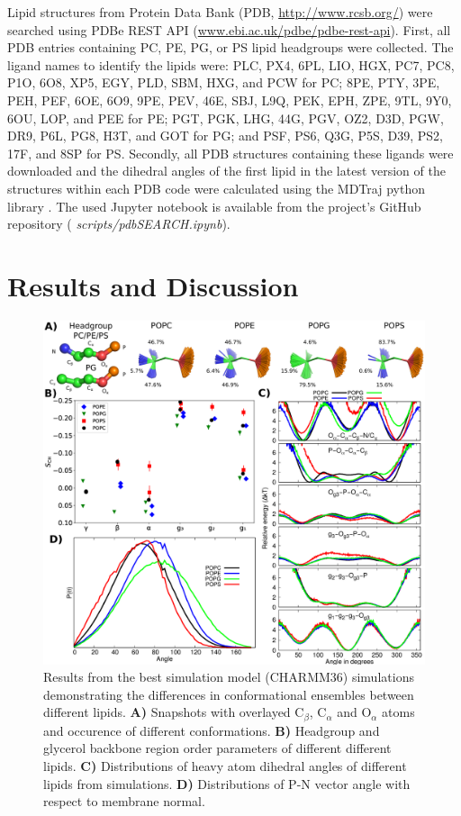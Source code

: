 \documentclass[aps,prl,superscriptaddress,twocolumn]{revtex4}
\begin{document}
Lipid structures from Protein Data Bank (PDB, \url{http://www.rcsb.org/})
were searched using PDBe REST API (\url{www.ebi.ac.uk/pdbe/pdbe-rest-api}).
First, all PDB entries containing PC, PE, PG, or PS lipid headgroups were collected.
The ligand names to identify the lipids were:
PLC, PX4, 6PL, LIO, HGX, PC7, PC8, P1O, 6O8, XP5, EGY, PLD, SBM, HXG, and PCW for PC;
8PE, PTY, 3PE, PEH, PEF, 6OE, 6O9, 9PE, PEV, 46E, SBJ, L9Q, PEK, EPH, ZPE, 9TL, 9Y0, 6OU, LOP, and PEE for PE;
PGT, PGK, LHG, 44G, PGV, OZ2, D3D, PGW, DR9, P6L, PG8, H3T, and GOT for PG; and
PSF, PS6, Q3G, P5S, D39, PS2, 17F, and 8SP for PS.
Secondly, all PDB structures containing these ligands were downloaded and the dihedral angles of the first lipid in the latest version of the structures within each PDB code were calculated using the MDTraj python library \cite{mcgibbon15}.
The used Jupyter notebook is available from the project's GitHub repository (\textit{ scripts/pdbSEARCH.ipynb}).



\section{Results and Discussion}

\begin{figure}[bt]
  \centering
   \includegraphics[width=18.0cm]{./Figs/figure2.eps}
   \caption{\label{structures}
     Results from the best simulation model (CHARMM36) simulations demonstrating the differences in conformational ensembles between different lipids. 
     \textbf{A)} Snapshots with overlayed C$_\beta$, C$_\alpha$ and O$_\alpha$ atoms and occurence of different conformations.
     \textbf{B)} Headgroup and glycerol backbone region order parameters of different different lipids.
     \textbf{C)} Distributions of heavy atom dihedral angles of different lipids from simulations.
     \textbf{D)} Distributions of P-N vector angle with respect to membrane normal.
  }
\end{figure}
\end{document}
